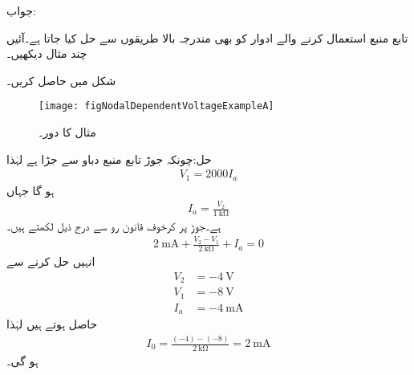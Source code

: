 جواب:

تابع  منبع استعمال کرنے والے ادوار کو بھی مندرجہ بالا طریقوں سے حل کیا جاتا ہے۔آئیں چند مثال دیکھیں۔


شکل  میں  حاصل کریں۔
\begin{figure}
\centering
\texttt{[image: figNodalDependentVoltageExampleA]}
\caption{مثال  کا دور۔}
\label{شکل_جوڑ_مثال_تابع_منبع_دباو_الف}
\end{figure}%

حل:چونکہ جوڑ  تابع منبع دباو سے جڑا ہے لہٰذا
\begin{align*}
V_1=2000 I_a
\end{align*}
ہو گا جہاں
\begin{align*}
I_a=\frac{V_2}{\SI{1}{\kilo\ohm}}
\end{align*}
ہے۔جوڑ  پر کرخوف قانون رو سے درج ذیل لکھتے ہیں۔
\begin{align*}
\SI{2}{\milli\ampere}+\frac{V_2-V_1}{\SI{2}{\kilo\ohm}}+I_a=0
\end{align*}
انہیں حل کرنے سے
\begin{align*}
V_2&=\SI{-4}{\volt}\\
V_1&=\SI{-8}{\volt}\\
I_a&=\SI{-4}{\milli\ampere}
\end{align*}
حاصل ہوتے ہیں لہٰذا
\begin{align*}
I_0=\frac{(-4)-(-8)}{\SI{2}{\kilo\ohm}}=\SI{2}{\milli\ampere}
\end{align*}
ہو گی۔

